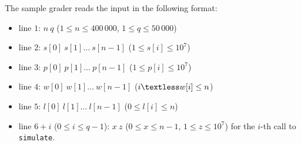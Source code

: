\newcommand{\gt}{\textgreater} 
\newcommand{\lt}{\textless} 


The sample grader reads the input in the following format:
\begin{itemize}
\item line $1$: $n\ q$ ($1 \leq n \leq 400\,000$, $1 \leq q \leq 50\,000$)
\item line $2$: $s[0]\ s[1]\ldots \ s[n-1]$ ($1 \leq s[i] \leq 10^{7}$)
\item line $3$: $p[0]\ p[1]\ldots \ p[n-1]$ ($1 \leq p[i] \leq 10^{7}$)
\item line $4$: $w[0]\ w[1]\ldots \ w[n-1]$ ($i \lt w[i] \leq n$)
\item line $5$: $l[0]\ l[1]\ldots \ l[n-1]$ ($0 \leq l[i] \leq n$)
\item line $6 + i$ ($0 \leq i \leq q - 1$): $x\ z$ ($0 \leq x \leq n-1$, $1 \leq z \leq 10^{7}$) for the $i$-th call to \texttt{simulate}.
\end{itemize}